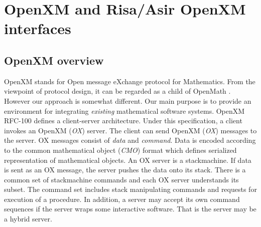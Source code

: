 \documentclass[runningheads]{cl2emult}
\begin{document}

\section{OpenXM and Risa/Asir OpenXM interfaces}

\subsection{OpenXM overview}

OpenXM stands for Open message eXchange protocol for Mathematics.
From the viewpoint of protocol design, it can be regarded as a child
of OpenMath \cite{noro:OPENMATH}.  However our approach is somewhat
different. Our main purpose is to provide an environment for
integrating {\it existing} mathematical software systems. OpenXM
RFC-100 \cite{noro:RFC100} defines a client-server architecture.  Under
this specification, a client invokes an OpenXM ({\it OX}) server.  The
client can send OpenXM ({\it OX}) messages to the server.  OX messages
consist of {\it data} and {\it command}. Data is encoded according to
the common mathematical object ({\it CMO}) format which defines
serialized representation of mathematical objects.  An OX server is a
stackmachine. If data is sent as an OX message, the server pushes the
data onto its stack. There is a common set of stackmachine commands
and each OX server understands its subset. The command set includes
stack manipulating commands and requests for execution of a procedure. 
In addition, a server may accept its own command sequences if the
server wraps some interactive software. That is the server may be a
hybrid server.
\end{document}
